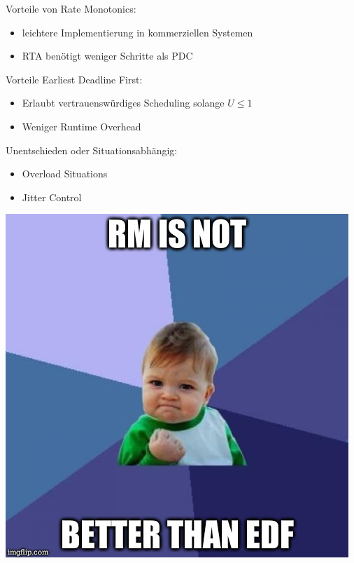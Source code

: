 \begin{frame}{\secname}
	Vorteile von Rate Monotonics:\pause
	\begin{itemize}
		\item leichtere Implementierung in kommerziellen Systemen
		\item RTA benötigt weniger Schritte als PDC
	\end{itemize}\pause
	Vorteile Earliest Deadline First:\pause
	\begin{itemize}
		\item Erlaubt vertrauenswürdiges Scheduling solange $U \leq 1$
		\item Weniger Runtime Overhead
	\end{itemize}\pause
	Unentschieden oder Situationsabhängig:\pause
	\begin{itemize}
		\item Overload Situations
		\item Jitter Control
	\end{itemize}
\end{frame}

\begin{frame}{\secname}
	\begin{center}
		\includegraphics[scale=0.35]{graphics/memes/success.jpg}
	\end{center}
\end{frame}

